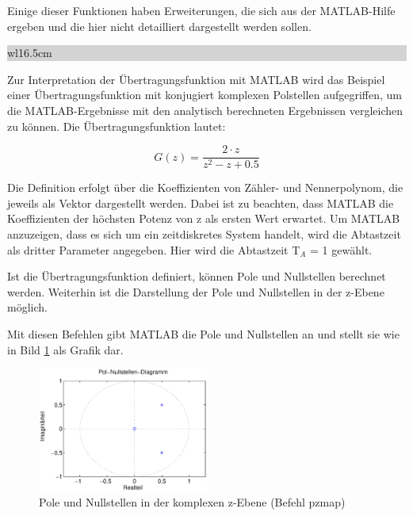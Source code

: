 \noindent Einige dieser Funktionen haben Erweiterungen, die sich aus der MATLAB-Hilfe ergeben und die hier nicht detailliert dargestellt werden sollen. \bigskip

\noindent
\colorbox{lightgray}{%
%
\renewcommand\arraystretch{0.6}%
\begin{tabular}{ wl{16.5cm} }
{\selectfont{Beispiel: Interpretation der Übertragungsfunktion mit MATLAB}}
\end{tabular}%
}\medskip

\noindent Zur Interpretation der Übertragungsfunktion mit MATLAB wird das Beispiel einer Übertragungsfunktion mit konjugiert komplexen Polstellen aufgegriffen, um die MATLAB-Ergebnisse mit den analytisch berechneten Ergebnissen vergleichen zu können. Die Übertragungsfunktion lautet:

\begin{equation}\label{eq:sixsonehundredtwentyfive}
G\left(z\right)=\frac{2\cdot z}{z^{2} -z+0.5}
\end{equation}

\noindent Die Definition erfolgt \"{u}ber die Koeffizienten von Z\"{a}hler- und Nennerpolynom, die jeweils als Vektor dargestellt werden. Dabei ist zu beachten, dass MATLAB die Koeffizienten der h\"{o}chsten Potenz von z als ersten Wert erwartet. Um MATLAB anzuzeigen, dass es sich um ein zeitdiskretes System handelt, wird die Abtastzeit als dritter Parameter angegeben. Hier wird die Abtastzeit T${}_{A}$ = 1 gew\"{a}hlt.

\clearpage



\noindent Ist die Übertragungsfunktion definiert, können Pole und Nullstellen berechnet werden. Weiterhin ist die Darstellung der Pole und Nullstellen in der z-Ebene möglich.



\noindent Mit diesen Befehlen gibt MATLAB die Pole und Nullstellen an und stellt sie wie in Bild \ref{fig:SystemInterpretationMatlab} als Grafik dar. 

\begin{figure}[H]
  \centerline{\includegraphics[width=0.5\textwidth]{Kapitel6/Bilder/image15.eps}}
  \caption{Pole und Nullstellen in der komplexen z-Ebene (Befehl pzmap)}
  \label{fig:SystemInterpretationMatlab}
\end{figure}

